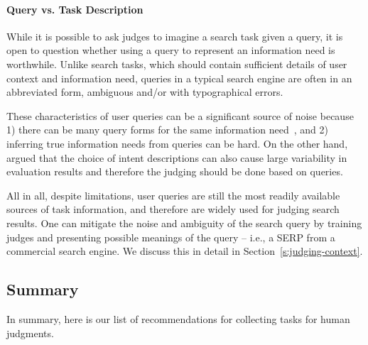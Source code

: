 
\paragraph{Query vs. Task Description} While it is possible to ask judges to imagine a search task given a query, it is open to question whether using a query to represent an information need is worthwhile. Unlike search tasks, which should contain sufficient details of user context and information need, queries in a typical search engine are often in an abbreviated form, ambiguous and/or with typographical errors. 

These characteristics of user queries can be a significant source of noise because 1) there can be many query forms for the same information need~\citep{Bailey:2015:UVI}, and 2) inferring true information needs from queries can be hard. On the other hand, \cite{Yilmaz:2014:EID} argued that the choice of intent descriptions can also cause large variability in evaluation results and therefore the judging should be done based on queries.

All in all, despite limitations, user queries are still the most readily available sources of task information, and therefore are widely used for judging search results. One can mitigate the noise and ambiguity of the search query by training judges and presenting possible meanings of the query -- i.e., a SERP from a commercial search engine. We discuss this in detail in Section~\ref{s:judging-context}.

\subsection{Summary}
In summary, here is our list of recommendations for collecting tasks for human judgments.

